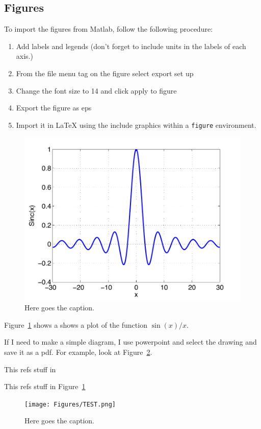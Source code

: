 \documentclass{UoNMCHA}
\numberwithin{equation}{section}
\begin{document}
\subsection{Figures}
To import the figures from Matlab, follow the following procedure:
\begin{enumerate}
    \item Add labels and legends (don't forget to include units in the labels of each axis.)
    \item From the file menu tag on the figure select export set up
    \item Change the font size to 14 and click apply to figure
    \item Export the figure as eps
    \item Import it in LaTeX using the include graphics within a \verb|figure| environment.
\end{enumerate}
%
\begin{figure}[ht]
    \begin{center}
        \includegraphics[width=.6\linewidth]{Figures/SincPlot}
        \caption{Here goes the caption.}
        \label{fig:Sinc}
    \end{center}
\end{figure}
Figure~\ref{fig:Sinc} shows a shows a plot of the function $\sin(x)/x$. 

If I need to make a simple diagram, I use powerpoint and select the drawing and save it as a pdf. For example, look at Figure~\ref{fig:MechaSys}.


This refs stuff in 


This refs stuff in Figure~\ref{fig:Sinc}

\begin{figure}[ht][0.8]
    \begin{center}
        \texttt{[image: Figures/TEST.png]}
        \caption{Here goes the caption.}
        \label{fig:MechaSys}
    \end{center}
\end{figure}
\end{document}
